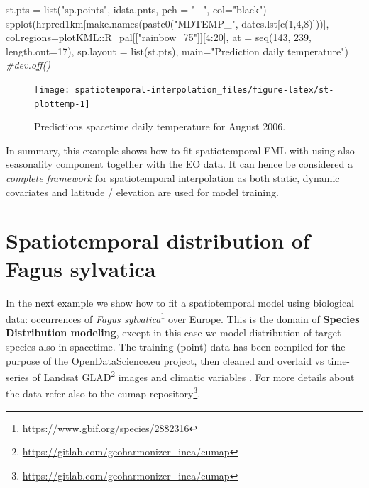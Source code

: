 \documentclass[
  graybox,natbib,nospthms]{svmono}
\newenvironment{Shaded}{\begin{snugshade}}{\end{snugshade}}
\newcommand{\AttributeTok}[1]{\textcolor[rgb]{0.61,0.61,0.61}{#1}}
\newcommand{\CommentTok}[1]{\textcolor[rgb]{0.37,0.37,0.37}{\textit{#1}}}
\newcommand{\DecValTok}[1]{\textcolor[rgb]{0.06,0.06,0.06}{#1}}
\newcommand{\FunctionTok}[1]{\textcolor[rgb]{0,0,0}{#1}}
\newcommand{\NormalTok}[1]{#1}
\newcommand{\OtherTok}[1]{\textcolor[rgb]{0.37,0.37,0.37}{#1}}
\newcommand{\SpecialCharTok}[1]{\textcolor[rgb]{0,0,0}{#1}}
\newcommand{\StringTok}[1]{\textcolor[rgb]{0.5,0.5,0.5}{#1}}
\renewcommand{\href}[2]{#2 (\url{#1})}
\renewcommand{\href}[2]{#2\footnote{\url{#1}}}
\begin{document}
\begin{Shaded}
\begin{Highlighting}[]
\NormalTok{st.pts }\OtherTok{=} \FunctionTok{list}\NormalTok{(}\StringTok{"sp.points"}\NormalTok{, idsta.pnts, }\AttributeTok{pch =} \StringTok{"+"}\NormalTok{, }\AttributeTok{col=}\StringTok{"black"}\NormalTok{)}
\FunctionTok{spplot}\NormalTok{(hrpred1km[}\FunctionTok{make.names}\NormalTok{(}\FunctionTok{paste0}\NormalTok{(}\StringTok{"MDTEMP\_"}\NormalTok{, dates.lst[}\FunctionTok{c}\NormalTok{(}\DecValTok{1}\NormalTok{,}\DecValTok{4}\NormalTok{,}\DecValTok{8}\NormalTok{)]))], }
       \AttributeTok{col.regions=}\NormalTok{plotKML}\SpecialCharTok{::}\NormalTok{R\_pal[[}\StringTok{"rainbow\_75"}\NormalTok{]][}\DecValTok{4}\SpecialCharTok{:}\DecValTok{20}\NormalTok{],}
       \AttributeTok{at =} \FunctionTok{seq}\NormalTok{(}\DecValTok{143}\NormalTok{, }\DecValTok{239}\NormalTok{, }\AttributeTok{length.out=}\DecValTok{17}\NormalTok{),}
       \AttributeTok{sp.layout =} \FunctionTok{list}\NormalTok{(st.pts),}
       \AttributeTok{main=}\StringTok{"Prediction daily temperature"}\NormalTok{)}
\CommentTok{\#dev.off()}
\end{Highlighting}
\end{Shaded}

\begin{figure}

{\centering \texttt{[image: spatiotemporal-interpolation\_files/figure-latex/st-plottemp-1]} 

}

\caption{Predictions spacetime daily temperature for August 2006.}\label{fig:st-plottemp}
\end{figure}

In summary, this example shows how to fit spatiotemporal EML with using
also seasonality component together with the EO data. It can hence
be considered a \emph{complete framework} for spatiotemporal interpolation as both static,
dynamic covariates and latitude / elevation are used for model training.

\hypertarget{spatiotemporal-distribution-of-fagus-sylvatica}{%
\section{Spatiotemporal distribution of Fagus sylvatica}\label{spatiotemporal-distribution-of-fagus-sylvatica}}

In the next example we show how to fit a spatiotemporal model
using biological data: occurrences of \href{https://www.gbif.org/species/2882316}{\emph{Fagus
sylvatica}} over Europe. This is
the domain of \textbf{Species Distribution modeling}, except in this case we
model distribution of target species also in spacetime. The training (point) data has
been compiled for the purpose of the OpenDataScience.eu project, then
cleaned and overlaid vs time-series of \href{https://gitlab.com/geoharmonizer_inea/eumap}{Landsat GLAD} images and climatic
variables \citep{witjes2021spatiotemporal, Bonannella2022}.
For more details about the data refer also to the \href{https://gitlab.com/geoharmonizer_inea/eumap}{eumap repository}.
\end{document}
